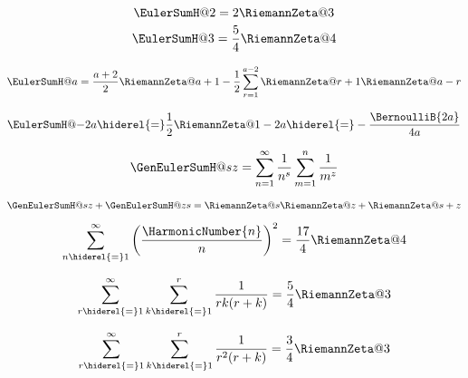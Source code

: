 \documentclass{article}
\begin{document}
  \begin{equation}\label{eq:ZE.ESUM.ESUM4.SE1}%
    \EulerSumH@{2} = 2 \RiemannZeta@{3}
  \end{equation}
  \begin{equation}\label{eq:ZE.ESUM.ESUM4.SE2}%
    \EulerSumH@{3} = \frac{5}{4} \RiemannZeta@{4}
  \end{equation}

\begin{equation}\label{eq:ZE.ESUM.ESUM6}%
  \EulerSumH@{a}
  = \frac{a+2}{2} \RiemannZeta@{a+1}
  - \frac{1}{2} \sum_{r=1}^{a-2} \RiemannZeta@{r+1} \RiemannZeta@{a-r}
\end{equation}

\begin{equation}\label{eq:ZE.ESUM.ESUM7}%
  \EulerSumH@{-2a}
  \hiderel{=} \frac{1}{2} \RiemannZeta@{1-2a}
  \hiderel{=} -\frac{\BernoulliB{2a}}{4a}
\end{equation}

\begin{equation}\label{eq:ZE.ESUM.ESUM8}%
  \GenEulerSumH@{s}{z}
  = \sum_{n=1}^\infty \frac{1}{n^s} \sum_{m=1}^n \frac{1}{m^z}
\end{equation}


\begin{equation}\label{eq:ZE.ESUM.ESUM9}%
  \GenEulerSumH@{s}{z} + \GenEulerSumH@{z}{s}
  = \RiemannZeta@{s} \RiemannZeta@{z} + \RiemannZeta@{s+z}
\end{equation}

\begin{equation}\label{eq:ZE.ESUM.ESUM15}%
  \sum_{n \hiderel{=} 1}^\infty \left( \frac{\HarmonicNumber{n}}{n} \right)^2
  = \frac{17}{4} \RiemannZeta@{4}
\end{equation}

\begin{equation}\label{eq:ZE.ESUM.ESUM16}%
  \sum_{r \hiderel{=} 1}^\infty \sum_{k \hiderel{=} 1}^r \frac{1}{rk(r+k)}
  = \frac{5}{4} \RiemannZeta@{3}
\end{equation}

\begin{equation}\label{eq:ZE.ESUM.ESUM17}%
  \sum_{r \hiderel{=} 1}^\infty \sum_{k \hiderel{=} 1}^r \frac{1}{r^2 (r+k)}
  = \frac{3}{4} \RiemannZeta@{3}
\end{equation}
\end{document}
